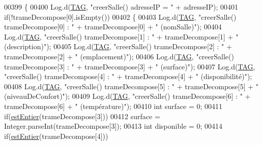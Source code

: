 \begin{DoxyCode}
00399     \{
00400         Log.d(\hyperlink{classcom_1_1lasalle_1_1meeting_1_1_main_activity_a8f934680ad3a7ec4ad0fea748f0b7506}{TAG}, \textcolor{stringliteral}{"creerSalle() adresseIP = "} + adresseIP);
00401         \textcolor{keywordflow}{if}(!trameDecompose[0].isEmpty())
00402         \{
00403             Log.d(\hyperlink{classcom_1_1lasalle_1_1meeting_1_1_main_activity_a8f934680ad3a7ec4ad0fea748f0b7506}{TAG}, \textcolor{stringliteral}{"creerSalle() trameDecompose[0] : "} + trameDecompose[0] + \textcolor{stringliteral}{" (nomSalle)"});
00404             Log.d(\hyperlink{classcom_1_1lasalle_1_1meeting_1_1_main_activity_a8f934680ad3a7ec4ad0fea748f0b7506}{TAG}, \textcolor{stringliteral}{"creerSalle() trameDecompose[1] : "} + trameDecompose[1] + \textcolor{stringliteral}{" (description)"});
00405             Log.d(\hyperlink{classcom_1_1lasalle_1_1meeting_1_1_main_activity_a8f934680ad3a7ec4ad0fea748f0b7506}{TAG}, \textcolor{stringliteral}{"creerSalle() trameDecompose[2] : "} + trameDecompose[2] + \textcolor{stringliteral}{" (emplacement)"});
00406             Log.d(\hyperlink{classcom_1_1lasalle_1_1meeting_1_1_main_activity_a8f934680ad3a7ec4ad0fea748f0b7506}{TAG}, \textcolor{stringliteral}{"creerSalle() trameDecompose[3] : "} + trameDecompose[3] + \textcolor{stringliteral}{" (surface)"});
00407             Log.d(\hyperlink{classcom_1_1lasalle_1_1meeting_1_1_main_activity_a8f934680ad3a7ec4ad0fea748f0b7506}{TAG}, \textcolor{stringliteral}{"creerSalle() trameDecompose[4] : "} + trameDecompose[4] + \textcolor{stringliteral}{" (disponibilité)"});
00408             Log.d(\hyperlink{classcom_1_1lasalle_1_1meeting_1_1_main_activity_a8f934680ad3a7ec4ad0fea748f0b7506}{TAG}, \textcolor{stringliteral}{"creerSalle() trameDecompose[5] : "} + trameDecompose[5] + \textcolor{stringliteral}{" (niveauDeConfort)"});
00409             Log.d(\hyperlink{classcom_1_1lasalle_1_1meeting_1_1_main_activity_a8f934680ad3a7ec4ad0fea748f0b7506}{TAG}, \textcolor{stringliteral}{"creerSalle() trameDecompose[6] : "} + trameDecompose[6] + \textcolor{stringliteral}{" (température)"});
00410             \textcolor{keywordtype}{int} surface = 0;
00411             \textcolor{keywordflow}{if}(\hyperlink{classcom_1_1lasalle_1_1meeting_1_1_main_activity_a3841414e5b270c189de0d58bbd2aca57}{estEntier}(trameDecompose[3]))
00412                 surface = Integer.parseInt(trameDecompose[3]);
00413             \textcolor{keywordtype}{int} disponible = 0;
00414             \textcolor{keywordflow}{if}(\hyperlink{classcom_1_1lasalle_1_1meeting_1_1_main_activity_a3841414e5b270c189de0d58bbd2aca57}{estEntier}(trameDecompose[4]))

\end{DoxyCode}
